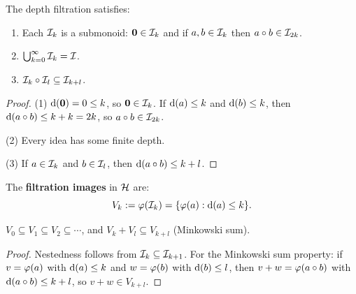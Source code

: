 \begin{proposition}
\label{prop:filtration}
The depth filtration satisfies:
\begin{enumerate}
\item Each $\mathcal{I}_k$ is a submonoid: $\mathbf{0} \in \mathcal{I}_k$ and if $a, b \in \mathcal{I}_k$
then $a \circ b \in \mathcal{I}_{2k}$.
\item $\bigcup_{k=0}^\infty \mathcal{I}_k = \mathcal{I}$.
\item $\mathcal{I}_k \circ \mathcal{I}_l \subseteq \mathcal{I}_{k+l}$.
\end{enumerate}
\end{proposition}

\begin{proof}
(1) $\operatorname{d}(\mathbf{0}) = 0 \leq k$, so $\mathbf{0} \in \mathcal{I}_k$. If $\operatorname{d}(a) \leq k$
and $\operatorname{d}(b) \leq k$, then $\operatorname{d}(a \circ b) \leq k + k = 2k$, so
$a \circ b \in \mathcal{I}_{2k}$.

(2) Every idea has some finite depth.

(3) If $a \in \mathcal{I}_k$ and $b \in \mathcal{I}_l$, then $\operatorname{d}(a \circ b) \leq k + l$.
\end{proof}

\begin{definition}
\label{def:filtration-images}
The \textbf{filtration images} in $\mathcal{H}$ are:
\[
  V_k := \varphi(\mathcal{I}_k) = \{\varphi(a) : \operatorname{d}(a) \leq k\}.
\]
\end{definition}

\begin{proposition}
\label{prop:nested-images}
$V_0 \subseteq V_1 \subseteq V_2 \subseteq \cdots$, and $V_k + V_l \subseteq
V_{k+l}$ (Minkowski sum).
\end{proposition}

\begin{proof}
Nestedness follows from $\mathcal{I}_k \subseteq \mathcal{I}_{k+1}$. For the Minkowski sum
property: if $v = \varphi(a)$ with $\operatorname{d}(a) \leq k$ and $w = \varphi(b)$ with
$\operatorname{d}(b) \leq l$, then $v + w = \varphi(a \circ b)$ with
$\operatorname{d}(a \circ b) \leq k + l$, so $v + w \in V_{k+l}$.
\end{proof}

